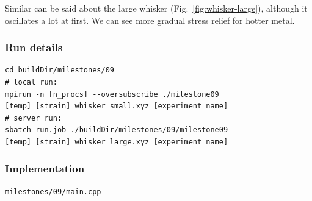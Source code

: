 \documentclass[12pt,a4paper]{article}
\begin{document}
Similar can be said about the large whisker (Fig.~\ref{fig:whisker-large}), although it oscillates a lot at first. We can see more gradual stress relief for hotter metal.

\subsubsection*{Run details}
\begin{verbatim}
cd buildDir/milestones/09
# local run:
mpirun -n [n_procs] --oversubscribe ./milestone09
[temp] [strain] whisker_small.xyz [experiment_name]
# server run:
sbatch run.job ./buildDir/milestones/09/milestone09
[temp] [strain] whisker_large.xyz [experiment_name]
\end{verbatim}

\subsubsection*{Implementation}
\begin{lstlisting}[breaklines]
milestones/09/main.cpp
\end{lstlisting}
\end{document}
